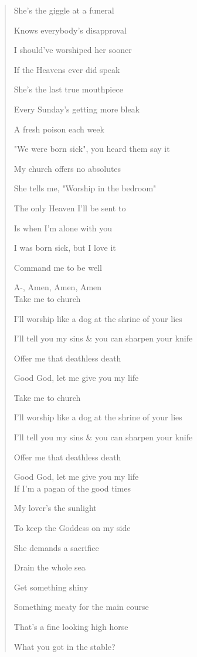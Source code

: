 \documentclass{article}
\begin{document}
\begin{enumerate}
\begin{quotation}
		She's the giggle at a funeral

		Knows everybody's disapproval

		I should've worshiped her sooner

		If the Heavens ever did speak

		She's the last true mouthpiece

		Every Sunday's getting more bleak

		A fresh poison each week

		"We were born sick", you heard them say it

		My church offers no absolutes

		She tells me, "Worship in the bedroom"

		The only Heaven I'll be sent to

		Is when I'm alone with you

		I was born sick, but I love it

		Command me to be well

		A-, Amen, Amen, Amen
		\\

		Take me to church

		I'll worship like a dog at the shrine of your lies

		I'll tell you my sins \& you can sharpen your knife

		Offer me that deathless death

		Good God, let me give you my life

		Take me to church

		I'll worship like a dog at the shrine of your lies

		I'll tell you my sins \& you can sharpen your knife

		Offer me that deathless death

		Good God, let me give you my life
		\\

		If I'm a pagan of the good times

		My lover's the sunlight

		To keep the Goddess on my side

		She demands a sacrifice

		Drain the whole sea

		Get something shiny

		Something meaty for the main course

		That's a fine looking high horse

		What you got in the stable?


\end{quotation}
\end{enumerate}
\end{document}
